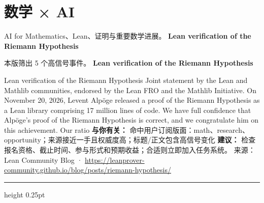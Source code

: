 \documentclass[10.5pt]{ctexart}
\begin{document}
\section*{数学 × AI}
{\color{ormuted} AI for Mathematics、Lean、证明与重要数学进展。}
\vspace{2mm}
{\LARGE\bfseries Lean verification of the Riemann Hypothesis}\par
\vspace{1mm}
{\color{ormuted} 本版筛出 5 个高信号事件。}
\vspace{3mm}
{\Large\bfseries Lean verification of the Riemann Hypothesis}\par
Lean verification of the Riemann Hypothesis Joint statement by the Lean and Mathlib communities, endorsed by the Lean FRO and the Mathlib Initiative. On November 20, 2026, Levent Alpöge released a proof of the Riemann Hypothesis as a Lean library comprising 17 million lines of code. We have full confidence that Alpöge's proof of the Riemann Hypothesis is correct, and we congratulate him on this achievement. Our ratio
\textbf{与你有关：} 命中用户订阅版面：math、research、opportunity；来源接近一手且权威度高；标题/正文包含高信号变化
\textbf{建议：} 检查报名资格、截止时间、参与形式和预期收益；合适则立即加入任务系统。
{\footnotesize\color{ormuted} 来源：Lean Community Blog · \url{https://leanprover-community.github.io/blog/posts/riemann-hypothesis/}}
\vspace{4mm}
\hrule height 0.25pt
\vspace{3mm}
\end{document}
